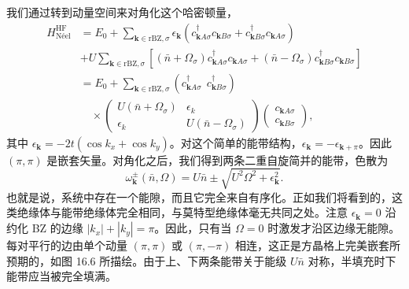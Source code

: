 我们通过转到动量空间来对角化这个哈密顿量，
\begin{align*}
H^{\mathrm{HF}}_{\text{N\'{e}el}}&=E_{0}+\sum_{\mathbf{k}\in \mathrm{rBZ},\sigma}\epsilon_{\mathbf{k}}\left(c^{\dagger}_{\mathbf{k}A\sigma}c_{\mathbf{k}B\sigma}+c^{\dagger}_{\mathbf{k}B\sigma}c_{\mathbf{k}A\sigma}\right)\\
&+U\sum_{\mathbf{k}\in \mathrm{rBZ},\sigma}\left[(\bar{n}+\Omega_{\sigma})c^{\dagger}_{\mathbf{k}A\sigma}c_{\mathbf{k}A\sigma}+(\bar{n}-\Omega_{\sigma})c^{\dagger}_{\mathbf{k}B\sigma}c_{\mathbf{k}B\sigma}\right]\\
&=E_{0}+\sum_{\mathbf{k}\in \mathrm{rBZ},\sigma}\left(c^{\dagger}_{\mathbf{k}A\sigma}\;\,c^{\dagger}_{\mathbf{k}B\sigma}\right)\\
&\quad\times\begin{pmatrix}U(\bar{n}+\Omega_{\sigma}) & \epsilon_{k}\\ \epsilon_{k} & U(\bar{n}-\Omega_{\sigma})\end{pmatrix}\begin{pmatrix}c_{\mathbf{k}A\sigma}\\ c_{\mathbf{k}B\sigma}\end{pmatrix},\tag{16.64}
\end{align*}
其中 $\epsilon_{\mathbf{k}}=-2t(\cos k_{x}+\cos k_{y})$。对这个简单的能带结构，$\epsilon_{\mathbf{k}}=-\epsilon_{\mathbf{k}+\pi}$。因此 $(\pi,\pi)$ 是嵌套矢量。对角化之后，我们得到两条二重自旋简并的能带，色散为
\begin{equation*}
\omega^{\pm}_{\mathbf{k}}(\bar{n},\Omega)=U\bar{n}\pm\sqrt{U^{2}\Omega^{2}+\epsilon^{2}_{\mathbf{k}}}.\tag{16.65}
\end{equation*}
也就是说，系统中存在一个能隙，而且它完全来自有序化。正如我们将看到的，这类绝缘体与能带绝缘体完全相同，与莫特型绝缘体毫无共同之处。注意 $\epsilon_{\mathbf{k}}=0$ 沿约化 BZ 的边缘 $|k_{x}|+|k_{y}|=\pi$。因此，只有当 $\Omega=0$ 时激发才沿区边缘无能隙。每对平行的边由单个动量 $(\pi,\pi)$ 或 $(\pi,-\pi)$ 相连，这正是方晶格上完美嵌套所预期的，如图 16.6 所描绘。由于上、下两条能带关于能级 $U\bar{n}$ 对称，半填充时下能带应当被完全填满。

